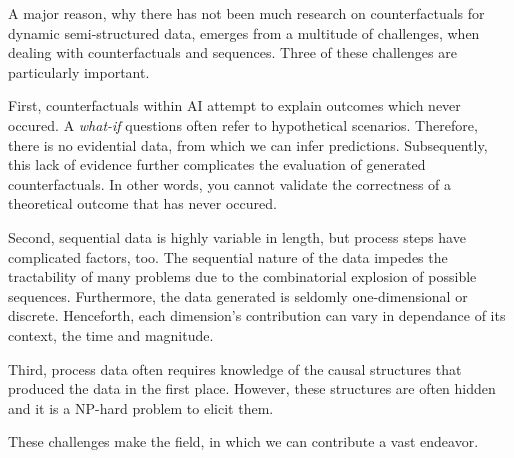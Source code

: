 \documentclass[./../../paper.tex]{subfiles}
\begin{document}
A major reason, why there has not been much research on counterfactuals for dynamic semi-structured data, emerges from a multitude of challenges, when dealing with counterfactuals and sequences. Three of these challenges are particularly important.
 
First, counterfactuals within AI attempt to explain outcomes which never occured. A \emph{what-if} questions often refer to hypothetical scenarios. Therefore, there is no evidential data, from which we can infer predictions. Subsequently, this lack of evidence further complicates the evaluation of generated counterfactuals. In other words, you cannot validate the correctness of a theoretical outcome that has never occured.

Second, sequential data is highly variable in length, but process steps have complicated factors, too. The sequential nature of the data impedes the tractability of many problems due to the combinatorial explosion of possible sequences. 
Furthermore, the data generated is seldomly one-dimensional or discrete. Henceforth, each dimension's contribution can vary in dependance of its context, the time and magnitude. 

Third, process data often requires knowledge of the causal structures that produced the data in the first place. However, these structures are often hidden and it is a NP-hard problem to elicit them\autocite{wang_Efficientrecoverymissing_2013}.

These challenges make the field, in which we can contribute a vast endeavor. 
\end{document}
